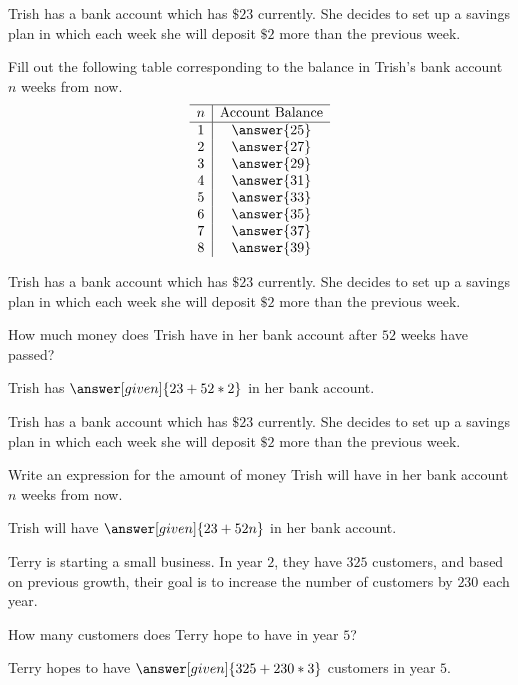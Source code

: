 \documentclass[nooutcomes]{ximera}
\begin{document}
\begin{problem}
Trish has a bank account which has $\$23$ currently.  She decides to set up a savings plan in which each week she will deposit $\$2$ more than the previous week.

Fill out the following table corresponding to the balance in Trish's bank account $n$ weeks from now.
\[
\begin{array}{c|c} \hline
n & \text{Account Balance} \\ \hline
1 & \answer{25} \\
2 & \answer{27} \\
3 & \answer{29}\\
4 & \answer{31}\\
5 & \answer{33}\\
6 & \answer{35}\\
7 & \answer{37}\\
8 & \answer{39}\\
\end{array}
\]
\end{problem}



\begin{problem}
Trish has a bank account which has $\$23$ currently.  She decides to set up a savings plan in which each week she will deposit $\$2$ more than the previous week.

How much money does Trish have in her bank account after $52$ weeks have passed?

\begin{prompt}
Trish has $\answer[given]{23+52*2}$ in her bank account.
\end{prompt}
\end{problem}




\begin{problem}
Trish has a bank account which has $\$23$ currently.  She decides to set up a savings plan in which each week she will deposit $\$2$ more than the previous week.

Write an expression for the amount of money Trish will have in her bank account $n$ weeks from now.

\begin{prompt}
Trish will have $\answer[given]{23+52n}$ in her bank account.
\end{prompt}
\end{problem}





\begin{problem}
Terry is starting a small business.  In year $2$, they have $325$ customers, and based on previous growth, their goal is to increase the number of customers by $230$ each year.


How many customers does Terry hope to have in year $5$?

\begin{prompt}
Terry hopes to have $\answer[given]{325+230*3}$ customers in year $5$.
\end{prompt}
\end{problem}
\end{document}
